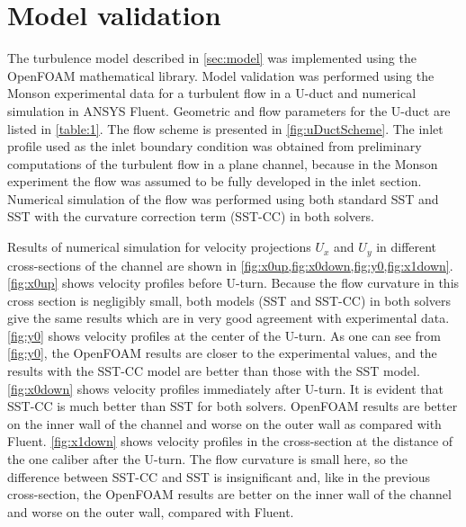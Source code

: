 \documentclass[a4paper]{jpconf}
\begin{document}
\section{Model validation}

The turbulence model described in \cref{sec:model} was implemented using the OpenFOAM mathematical library. Model validation was performed using the Monson \cite{Monson} experimental data for a turbulent flow in a U-duct and numerical simulation in ANSYS Fluent. Geometric and flow parameters for the U-duct are listed in \cref{table:1}. The flow scheme is presented in \cref{fig:uDuctScheme}.
The inlet profile used as the inlet boundary condition was obtained from preliminary 
computations of the turbulent flow in a plane channel, because in the Monson experiment \cite{Monson} the 
flow was assumed to be fully developed in the inlet section. Numerical simulation of the flow 
was performed using both standard SST and SST with the curvature correction term (SST-CC) in 
both solvers.

Results of numerical simulation for velocity projections $U_x$ and $U_y$ in different cross-sections of the channel are shown in \cref{fig:x0up,fig:x0down,fig:y0,fig:x1down}. \cref{fig:x0up} shows velocity profiles before U-turn. Because the flow curvature in this cross section is negligibly small, both models (SST and SST-CC) in both solvers give the same results which are in very good agreement with experimental data. \cref{fig:y0}  shows velocity  profiles at the center of the U-turn. As one can see from \cref{fig:y0}, the OpenFOAM results are closer to the experimental values, and the results with the SST-CC model are better than those with the SST model. \cref{fig:x0down} shows velocity profiles immediately after U-turn. It is evident that SST-CC is much better than SST for both solvers. OpenFOAM results are better on the inner wall of the channel and worse on the outer wall as compared with Fluent. \cref{fig:x1down} shows velocity profiles in the cross-section at the distance of the one caliber after the U-turn. The flow curvature is small here, so the difference between SST-CC and SST is insignificant and, like in the previous cross-section, the OpenFOAM results are better on the inner wall of the channel and worse on the outer wall, compared with Fluent.
\end{document}
